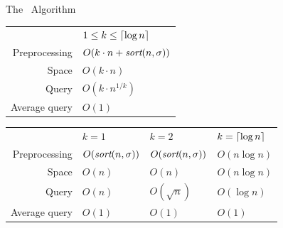 \documentclass{beamer}
\begin{document}
\begin{frame}{The \fprintk\ Algorithm}
    \begin{tabular}{r l}
        & $1\leq k\leq\lceil\log n\rceil$ \\
        Preprocessing & $O(k\cdot n + \textit{sort}(n,\sigma))$ \\
        Space & $O(k\cdot n)$\\
        Query & $O(k\cdot n^{1/k})$ \\
        Average query & $O(1)$ \\
    \end{tabular}

    \vspace{2em}

    \begin{tabular}{r l l l}
        & $k=1$ & $k=2$ & $k=\lceil\log n\rceil$ \\
        Preprocessing & $O(\textit{sort}(n,\sigma))$ & $O(\textit{sort}(n,\sigma))$ & $O(n\log n)$ \\
        Space & $O(n)$ & $O(n)$ & $O(n\log n)$ \\
        Query & $O(n)$ & $O(\sqrt n)$ & $O(\log n)$ \\
        Average query & $O(1)$ & $O(1)$ & $O(1)$ \\
    \end{tabular}
\end{frame}
\end{document}
